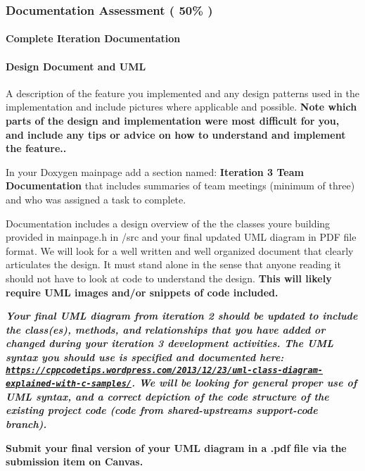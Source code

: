 \subsubsection*{Documentation Assessment ( 50\% )}

\paragraph*{Complete Iteration Documentation}

\paragraph*{Design Document and U\+ML}

A description of the feature you implemented and any design patterns used in the implementation and include pictures where applicable and possible. {\bfseries Note which parts of the design and implementation were most difficult for you, and include any tips or advice on how to understand and implement the feature..}

In your Doxygen mainpage add a section named\+: {\bfseries Iteration 3 Team Documentation} that includes summaries of team meetings (minimum of three) and who was assigned a task to complete.

Documentation includes a design overview of the the classes you\textquotesingle{}re building provided in mainpage.\+h in /src and your final updated U\+ML diagram in P\+DF file format. We will look for a well written and well organized document that clearly articulates the design. It must stand alone in the sense that anyone reading it should not have to look at code to understand the design. {\bfseries This will likely require U\+ML images and/or snippets of code included.}

{\itshape {\bfseries Your final U\+ML diagram from iteration 2 should be updated to include the class(es), methods, and relationships that you have added or changed during your iteration 3 development activities. The U\+ML syntax you should use is specified and documented here\+: \href{https://cppcodetips.wordpress.com/2013/12/23/uml-class-diagram-explained-with-c-samples/}{\tt https\+://cppcodetips.\+wordpress.\+com/2013/12/23/uml-\/class-\/diagram-\/explained-\/with-\/c-\/samples/}. We will be looking for general proper use of U\+ML syntax, and a correct depiction of the code structure of the existing project code (code from shared-\/upstream\textquotesingle{}s support-\/code branch).}}

{\bfseries Submit your final version of your U\+ML diagram in a .pdf file via the submission item on Canvas.}

